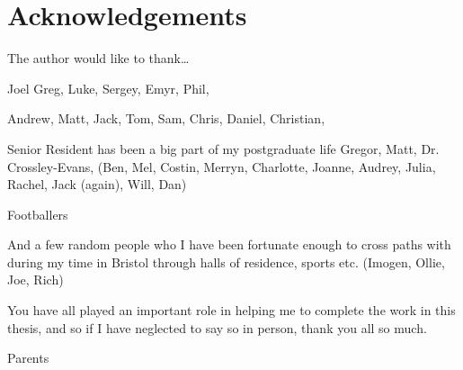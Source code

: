 \chapter*{Acknowledgements} %

The author would like to thank\ldots

Joel
Greg, Luke, Sergey, Emyr, Phil,

Andrew, Matt, Jack, Tom, Sam, Chris, Daniel, Christian, 

Senior Resident has been a big part of my postgraduate life Gregor, Matt, Dr. Crossley-Evans, (Ben, Mel,
Costin, Merryn, Charlotte, Joanne, Audrey, Julia, Rachel, Jack (again), Will, Dan)

Footballers

And a few random people who I have been fortunate enough to cross paths with during my time in Bristol through
halls of residence, sports etc. (Imogen, Ollie, Joe, Rich)

You have all played an important role in helping me to complete the work in this thesis, and so if I
have neglected to say so in person, thank you all so much.

Parents